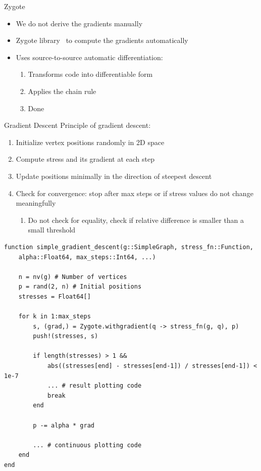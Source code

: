 \documentclass{beamer}
\begin{document}
\begin{frame}{Zygote}
    \begin{itemize}
        \item We do not derive the gradients manually
        \item Zygote library~\cite{zygotejl} to compute the gradients automatically
        \item Uses source-to-source automatic differentiation:
        \begin{enumerate}
            \item Transforms code into differentiable form
            \item Applies the chain rule
            \item Done 
        \end{enumerate}
    \end{itemize}
\end{frame}

\begin{frame}{Gradient Descent}
    Principle of gradient descent:
    \begin{enumerate}
        \item Initialize vertex positions randomly in 2D space
        \item Compute stress and its gradient at each step
        \item Update positions minimally in the direction of steepest descent
        \item Check for convergence: stop after max steps or if stress values do not change meaningfully
        \begin{enumerate}[$\rightarrow$]
            \item Do not check for equality, check if relative difference is smaller than a small threshold
        \end{enumerate}
    \end{enumerate}
\end{frame}

\begin{frame}[fragile]
\begin{verbatim}
function simple_gradient_descent(g::SimpleGraph, stress_fn::Function, 
    alpha::Float64, max_steps::Int64, ...)

    n = nv(g) # Number of vertices
    p = rand(2, n) # Initial positions
    stresses = Float64[]

    for k in 1:max_steps
        s, (grad,) = Zygote.withgradient(q -> stress_fn(g, q), p)
        push!(stresses, s)

        if length(stresses) > 1 &&
            abs((stresses[end] - stresses[end-1]) / stresses[end-1]) < 1e-7
            ... # result plotting code
            break
        end

        p -= alpha * grad

        ... # continuous plotting code
    end
end
\end{verbatim}
\end{frame}
\end{document}
